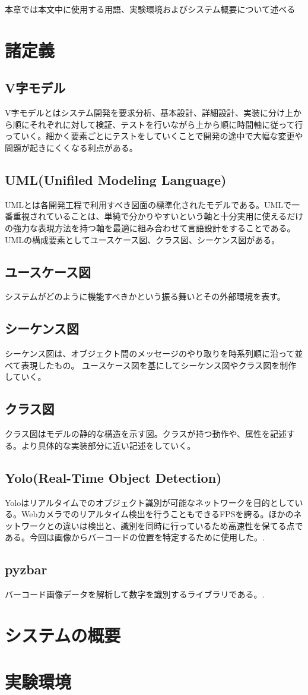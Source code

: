 本章では本文中に使用する用語、実験環境およびシステム概要について述べる

\section{諸定義}

\subsection*{V字モデル}
V字モデルとはシステム開発を要求分析、基本設計、詳細設計、実装に分け上から順にそれぞれに対して検証、テストを行いながら上から順に時間軸に従って行っていく。細かく要素ごとにテストをしていくことで開発の途中で大幅な変更や問題が起きにくくなる利点がある。

\subsection*{UML(Unifiled Modeling Language)}
UMLとは各開発工程で利用すべき図面の標準化されたモデルである。UMLで一番重視されていることは、単純で分かりやすいという軸と十分実用に使えるだけの強力な表現方法を持つ軸を最適に組み合わせて言語設計をすることである。UMLの構成要素としてユースケース図、クラス図、シーケンス図がある。\cite{uml}

\subsection*{ユースケース図}
システムがどのように機能すべきかという振る舞いとその外部環境を表す。


\subsection*{シーケンス図}
シーケンス図は、オブジェクト間のメッセージのやり取りを時系列順に沿って並べて表現したもの。
ユースケース図を基にしてシーケンス図やクラス図を制作していく。

\subsection*{クラス図}
クラス図はモデルの静的な構造を示す図。クラスが持つ動作や、属性を記述する。より具体的な実装部分に近い記述をしていく。

\subsection*{Yolo(Real-Time Object Detection)}
Yoloはリアルタイムでのオブジェクト識別が可能なネットワークを目的としている。Webカメラでのリアルタイム検出を行うこともできるFPSを誇る。ほかのネットワークとの違いは検出と、識別を同時に行っているため高速性を保てる点である。今回は画像からバーコードの位置を特定するために使用した。\cite{yolo}.


\subsection*{pyzbar}
バーコード画像データを解析して数字を識別するライブラリである。\cite{pyzbar}.

\section{システムの概要}

\section{実験環境}